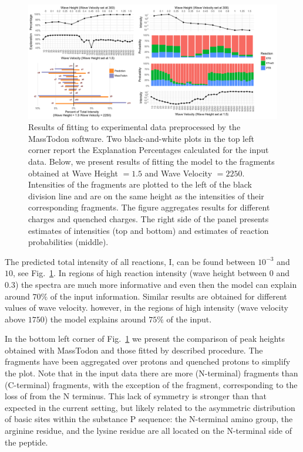 \documentclass{llncs}
\begin{document}
\begin{figure}[h]
        \center
        \includegraphics[width=1.1\textwidth]{melon.png}
        \caption{ Results of fitting to experimental data preprocessed by the {\sc MassTodon} software. Two black-and-white plots in the top left corner report the Explanation Percentages calculated for the input data. Below, we present results of fitting the model to the fragments obtained at Wave Height $= 1.5$ and Wave Velocity $= 2250$. Intensities of the  fragments are plotted to the left of the black division line and are on the same height as the intensities of their corresponding  fragments. The figure aggregates results for different charges and quenched charges. The right side of the panel presents estimates of intensities (top and bottom) and estimates of reaction probabilities (middle).
        }\label{fig::melon}
\end{figure}
The predicted total intensity of all reactions, I, can be found between $10^{-3}$ and $10$, see Fig.~\ref{fig::melon}. In regions of high reaction intensity (wave height between $0$ and $0.3$) the spectra are much more informative and even then the model can explain around $70\%$ of the input information. Similar results are obtained for different values of wave velocity. however, in the regions of high intensity (wave velocity above $1750$) the model explains around $75\%$ of the input.

In the bottom left corner of Fig.~\ref{fig::melon} we present the comparison of peak heights obtained with {\sc MassTodon} and those fitted by described procedure. The fragments have been aggregated over protons and quenched protons to simplify the plot. Note that in the input data there are more (N-terminal)  fragments than (C-terminal)  fragments, with the exception of the  fragment, corresponding to the loss of  from the N terminus. This lack of symmetry is stronger than that expected in the current setting, but likely related to the asymmetric distribution of basic sites within the substance P sequence: the N-terminal amino group, the arginine residue, and the lysine residue are all located on the N-terminal side of the peptide.
\end{document}
